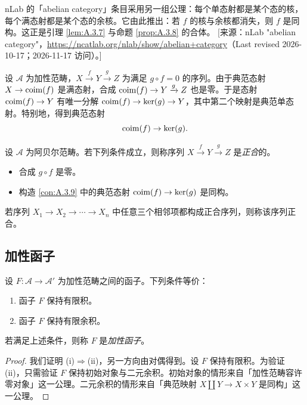 \begin{yizhu}
nLab 的「abelian category」条目采用另一组公理：每个单态射都是某个态的核，每个满态射都是某个态的余核。它由此推出：若 $f$ 的核与余核都消失，则 $f$ 是同构。这正是引理 \ref{lem:A.3.7} 与命题 \ref{prop:A.3.8} 的合体。
[来源：nLab "abelian category"，\url{https://ncatlab.org/nlab/show/abelian+category}（Last revised 2026-10-17；2026-11-17 访问）。]
\end{yizhu}

\begin{construction}\label{con:A.3.9}
设 $\mathcal{A}$ 为加性范畴，$X\xrightarrow{f}Y\xrightarrow{g}Z$ 为满足 $g\circ f=0$ 的序列。由于典范态射 $X\to\operatorname{coim}(f)$ 是满态射，合成 $\operatorname{coim}(f)\to Y\xrightarrow{g}Z$ 也是零。于是态射 $\operatorname{coim}(f)\to Y$ 有唯一分解 $\operatorname{coim}(f)\to\ker(g)\to Y$，其中第二个映射是典范单态射。特别地，得到典范态射
\[
\operatorname{coim}(f)\to\ker(g).
\]
\end{construction}

\begin{definition}\label{def:A.3.10}
设 $\mathcal{A}$ 为阿贝尔范畴。若下列条件成立，则称序列 $X\xrightarrow{f}Y\xrightarrow{g}Z$ 是\emph{正合}的。
\begin{itemize}[leftmargin=2em,itemsep=0.25ex]
  \item 合成 $g\circ f$ 是零。
  \item 构造 \ref{con:A.3.9} 中的典范态射 $\operatorname{coim}(f)\to\ker(g)$ 是同构。
\end{itemize}
若序列 $X_1\to X_2\to\cdots\to X_n$ 中任意三个相邻项都构成正合序列，则称该序列正合。
\end{definition}

\subsection{加性函子}\label{sec:A.4}

\begin{propdef}\label{prop:A.4.1}
设 $F:\mathcal{A}\to\mathcal{A}'$ 为加性范畴之间的函子。下列条件等价：
\begin{enumerate}[label=(\roman*),leftmargin=2em,itemsep=0.25ex]
  \item 函子 $F$ 保持有限积。
  \item 函子 $F$ 保持有限余积。
\end{enumerate}
若满足上述条件，则称 $F$ 是\emph{加性函子}。
\end{propdef}

\begin{proof}
我们证明 (i)$\Rightarrow$(ii)，另一方向由对偶得到。设 $F$ 保持有限积。为验证 (ii)，只需验证 $F$ 保持初始对象与二元余积。初始对象的情形来自「加性范畴容许零对象」这一公理。二元余积的情形来自「典范映射 $X\coprod Y\to X\times Y$ 是同构」这一公理。
\end{proof}

